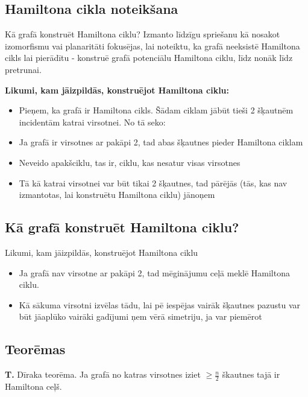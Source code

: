 \documentclass{article}
\begin{document}
\subsection{Hamiltona cikla noteikšana}
Kā grafā konstruēt Hamiltona ciklu? Izmanto līdzīgu spriešanu kā nosakot izomorfismu vai planaritāti fokusējas, lai noteiktu, ka grafā neeksistē Hamiltona cikls lai pierādītu - konstruē grafā potenciālu Hamiltona ciklu, līdz nonāk līdz pretrunai.

\textbf{Likumi, kam jāizpildās, konstruējot Hamiltona ciklu:}
\begin{itemize}
	\item Pieņem, ka grafā ir Hamiltona cikls. Šādam ciklam jābūt tieši 2 šķautnēm incidentām katrai virsotnei. No tā seko:
	\item Ja grafā ir virsotnes ar pakāpi 2, tad abas šķautnes pieder Hamiltona ciklam
	\item Neveido apakšciklu, tas ir, ciklu, kas nesatur visas virsotnes
	\item Tā kā katrai virsotnei var būt tikai 2 šķautnes, tad pārējās (tās, kas nav izmantotas, lai konstruētu Hamiltona ciklu) jānoņem
\end{itemize}
	
\subsection{Kā grafā konstruēt Hamiltona ciklu?}
Likumi, kam jāizpildās, konstruējot Hamiltona ciklu
\begin{itemize}
	\item Ja grafā nav virsotne ar pakāpi 2, tad mēginājumu ceļā meklē Hamiltona ciklu.
	\item Kā sākuma virsotni izvēlas tādu, lai pē iespējas vairāk šķautnes pazustu var būt jāaplūko vairāki gadījumi ņem vērā simetriju, ja var piemērot
\end{itemize}
	
\subsection{Teorēmas}

\textbf{T. } Dīraka teorēma. Ja grafā no katras virsotnes iziet $\ge \frac{n}{2}$ škautnes tajā ir Hamiltona ceļš.
\end{document}
